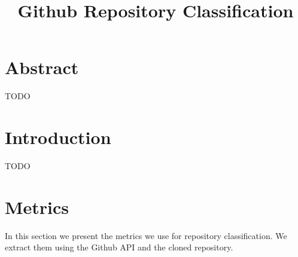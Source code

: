 \documentclass[a4paper]{scrartcl}
\title{Github Repository Classification}
\begin{document}
\maketitle
\section{Abstract}
TODO
\section{Introduction}
TODO

\section{Metrics}
In this section we present the metrics we use for repository classification. We extract them using the Github API and the cloned repository.
\end{document}
